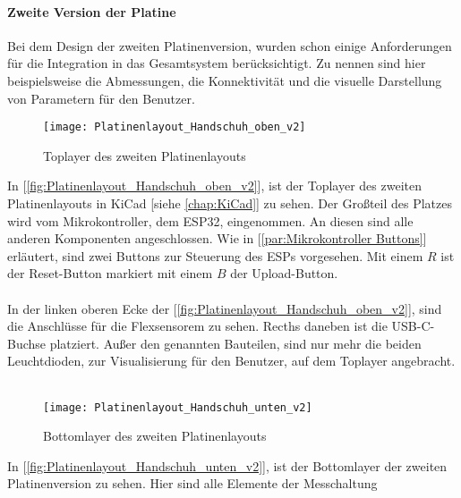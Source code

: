 \documentclass[titlepage,12pt,twoside]{article}
\begin{document}
\paragraph{Zweite Version der Platine}
\hfill \break
\hfill \break
Bei dem Design der zweiten Platinenversion, wurden schon einige Anforderungen für die Integration in das Gesamtsystem
berücksichtigt. Zu nennen sind hier beispielsweise die Abmessungen, die Konnektivität und die visuelle Darstellung 
von Parametern für den Benutzer. \\

\begin{figure}[H]
	\begin{center}
		\scalebox{0.8}
		{\texttt{[image: Platinenlayout\_Handschuh\_oben\_v2]}}
		\caption{Toplayer des zweiten Platinenlayouts}
		\label{fig:Platinenlayout_Handschuh_oben_v2}		
	\end{center}
\end{figure}
\hfill \break
In [\textcolor{blue}{\autoref{fig:Platinenlayout_Handschuh_oben_v2}}], ist der Toplayer des zweiten Platinenlayouts in KiCad [siehe \textcolor{blue}{\autoref{chap:KiCad}}] zu sehen.
Der Großteil des Platzes wird vom Mikrokontroller, dem ESP32, eingenommen. An diesen sind alle anderen Komponenten angeschlossen. Wie in 
[\textcolor{blue}{\autoref{par:Mikrokontroller Buttons}}] erläutert, sind zwei Buttons zur Steuerung des ESPs vorgesehen. Mit einem $R$ ist der Reset-Button markiert
mit einem $B$ der Upload-Button. \\
\\
In der linken oberen Ecke der [\textcolor{blue}{\autoref{fig:Platinenlayout_Handschuh_oben_v2}}], sind die Anschlüsse für die Flexsensorem zu sehen. Recths daneben
ist die USB-C-Buchse platziert. Außer den genannten Bauteilen, sind nur mehr die beiden Leuchtdioden, zur Visualisierung für den Benutzer, auf dem 
Toplayer angebracht. \\
\\
\begin{figure}[H]
	\begin{center}
		\scalebox{0.8}
		{\texttt{[image: Platinenlayout\_Handschuh\_unten\_v2]}}
		\caption{Bottomlayer des zweiten Platinenlayouts}
		\label{fig:Platinenlayout_Handschuh_unten_v2}		
	\end{center}
\end{figure}
\hfill \break
In [\textcolor{blue}{\autoref{fig:Platinenlayout_Handschuh_unten_v2}}], ist der Bottomlayer der zweiten Platinenversion zu sehen. Hier sind alle Elemente der Messchaltung
\end{document}
